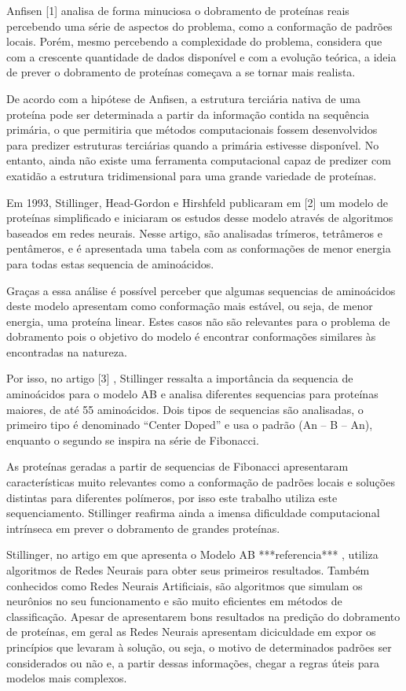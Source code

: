 \documentclass[dm,ppgcomp]{texfurg}
\begin{document}
Anfisen [1] analisa de forma minuciosa o dobramento de proteínas reais percebendo uma série de aspectos do problema, como a conformação de padrões locais. Porém, mesmo percebendo a complexidade do problema, considera que com a crescente quantidade de dados disponível e com a evolução teórica, a ideia de prever o dobramento de proteínas começava a se tornar mais realista.

De acordo com a hipótese de Anfisen, a estrutura terciária nativa de uma proteína pode ser determinada a partir da informação contida na sequência primária, o que permitiria que métodos computacionais fossem desenvolvidos para predizer estruturas terciárias quando a primária estivesse disponível. No entanto, ainda não existe uma ferramenta computacional capaz de predizer com exatidão a estrutura tridimensional para uma grande variedade de proteínas.

Em 1993, Stillinger, Head-Gordon e Hirshfeld publicaram em [2] um modelo de proteínas simplificado e iniciaram os estudos desse modelo através de algoritmos baseados em  redes neurais. Nesse artigo, são analisadas trímeros, tetrâmeros e pentâmeros, e é apresentada uma tabela com as conformações de menor energia para todas estas sequencia de aminoácidos.

Graças a essa análise é possível perceber que algumas sequencias de aminoácidos deste modelo apresentam como conformação mais estável, ou seja, de menor energia, uma proteína linear. Estes casos não são relevantes para o problema de dobramento pois o objetivo do modelo é encontrar conformações similares às encontradas na natureza.

Por isso, no artigo [3] , Stillinger ressalta a importância da sequencia de aminoácidos para o modelo AB e analisa diferentes sequencias para proteínas maiores, de até 55 aminoácidos. Dois tipos de sequencias são analisadas, o primeiro tipo é denominado “Center Doped” e usa o padrão (An – B – An), enquanto o segundo se inspira na  série de Fibonacci.

As proteínas geradas a partir de sequencias de Fibonacci apresentaram características muito relevantes como a conformação de padrões locais e soluções distintas para diferentes  polímeros, por isso este trabalho utiliza este sequenciamento. Stillinger reafirma ainda a imensa dificuldade computacional intrínseca em prever o dobramento de grandes proteínas. 

Stillinger, no artigo em que apresenta o Modelo AB ***referencia*** , utiliza algoritmos de Redes Neurais para obter seus primeiros resultados. Também conhecidos como Redes Neurais Artificiais, são algoritmos que simulam os neurônios no seu funcionamento e são muito eficientes em métodos de classificação. Apesar de apresentarem bons resultados na predição do dobramento de proteínas, em geral as Redes Neurais apresentam diciculdade em expor os princípios que levaram à solução, ou seja, o motivo de determinados padrões ser considerados ou não e, a partir dessas informações, chegar a regras úteis para modelos mais complexos.
\end{document}
